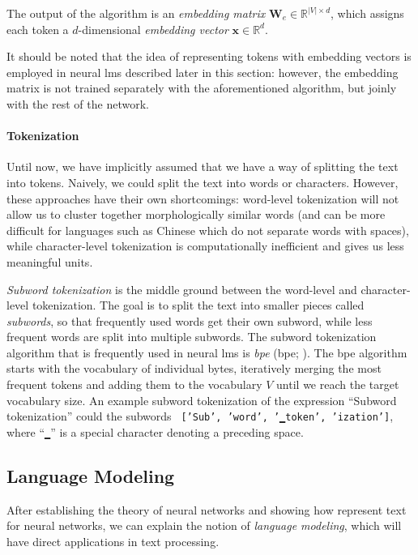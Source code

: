 {The output of the algorithm is an \textit{embedding matrix} $\mathbf{W}_e \in \mathbb{R}^{|V|\times d}$, which assigns each token a $d$-dimensional \textit{embedding vector} $\mathbf{x} \in \mathbb{R}^{d}$.

It should be noted that the idea of representing tokens with embedding vectors is employed in neural \acp{lm} described later in this section: however, the embedding matrix is not trained separately with the aforementioned algorithm, but joinly with the rest of the network.



\paragraph{Tokenization} Until now, we have implicitly assumed that we have a way of splitting the text into tokens. Naively, we could split the text into words or characters. However, these approaches have their own shortcomings: word-level tokenization will not allow us to cluster together morphologically similar words (and can be more difficult for languages such as Chinese which do not separate words with spaces), while character-level tokenization is computationally inefficient and gives us less meaningful units.

\emph{Subword tokenization}  is the middle ground between the word-level and character-level tokenization. The goal is to split the text into smaller pieces called \emph{subwords}, so that frequently used words get their own subword, while less frequent words are split into multiple subwords. The subword tokenization algorithm that is frequently used in neural \acp{lm} is \emph{\acl{bpe}} (\acs{bpe}; \citealp{sennrich2016neural}). The \ac{bpe} algorithm starts with the vocabulary of individual bytes, iteratively merging the most frequent tokens and adding them to the vocabulary $V$ until we reach the target vocabulary size. An example subword tokenization of the expression ``Subword tokenization'' could the subwords \texttt{ ['Sub', 'word', '▁token', 'ization']}, where ``\texttt{▁}'' is a special character denoting a preceding space.


\subsection{Language Modeling}
\label{sec:lm-basics}
After establishing the theory of neural networks and showing how represent text for neural networks, we can explain the notion of \emph{language modeling}, which will have direct applications in text processing.

}
